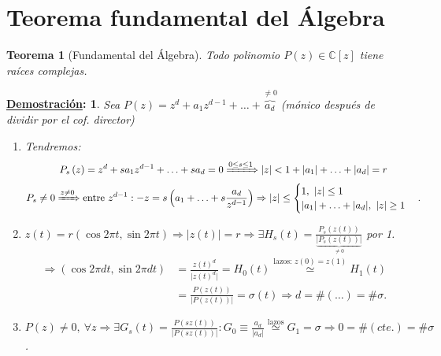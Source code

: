 \documentclass[10pt,a4paper,openright]{book}
\theoremstyle{break}
\newtheorem*{theo}{Teorema}
\newtheorem*{demo}{\underline{Demostración}:}
\begin{document}
\section{Teorema fundamental del Álgebra}%
\label{sec:teorema_fundamental_del_algebra}
\begin{theo}[Fundamental del Álgebra]
Todo polinomio $P\left( z \right) \in \mathbb{C}\left[ z \right]$ tiene raíces complejas. 
\end{theo}
\begin{demo}
Sea $P\left( z \right) = z^d + a_1z^{d - 1} + \ldots + \overbrace{a_d}^{\neq 0}$ (mónico después de dividir por el cof. director)
\begin{enumerate}
    \item Tendremos:
    \begin{gather*}
        P_s\left( z \right) = z^d + sa_1z^{d - 1} + \ldots + sa_d = 0 \xRightarrow{0 \le s \le 1} \lvert z \rvert < 1 + \lvert a_1 \rvert + \ldots + \lvert a_d \rvert = r\\
        P_s \neq 0 \xRightarrow{z\neq 0} \text{entre } z^{d - 1}: -z = s\left( a_1 + \ldots + s \frac{a_d}{z^{d - 1}} \right) \Rightarrow \lvert z \rvert \le \begin{cases}
            1,\ \lvert z \rvert \le 1\\
            \lvert a_1 \rvert + \ldots + \lvert a_d \rvert,\ \lvert z \rvert \ge 1
        \end{cases} 
    .\end{gather*}

    \item $z\left( t \right) = r\left( \cos 2 \pi t, \sin 2 \pi t \right) \Rightarrow \lvert z \left( t \right)\rvert  = r \Rightarrow \exists H_s\left( t \right) = \frac{P_s\left( z\left( t \right) \right)}{\underbrace{\lvert P_s\left( z\left( t \right) \right) \rvert}_{\neq 0} }$ por 1.
    \begin{align*}
        \Rightarrow \left( \cos 2 \pi dt, \sin 2 \pi dt \right) &= \frac{z\left( t \right)^d}{\lvert z\left( t \right)^d \rvert} = H_0\left( t \right) \stackrel{\text{lazos: } z\left( 0 \right)= z\left( 1 \right)}{\simeq} H_1\left( t \right)\\
        &= \frac{P\left( z\left( t \right) \right)}{\lvert P\left( z \left( t \right) \right) \rvert} = \sigma\left( t \right) \Rightarrow d = \# \left( \ldots \right) = \# \sigma 
    .\end{align*}

    \item $P\left( z \right) \neq 0,\ \forall z \Rightarrow \exists G_s\left( t \right) = \frac{P\left( sz\left( t \right) \right)}{\lvert P\left( sz\left( t \right) \right) \rvert} : G_0 \equiv \frac{a_d}{\lvert a_d \rvert} \stackrel{\text{lazos}}{\simeq} G_1 = \sigma \Rightarrow 0 = \# \left( cte. \right) = \# \sigma$.
\end{enumerate}
\end{demo}
\end{document}
